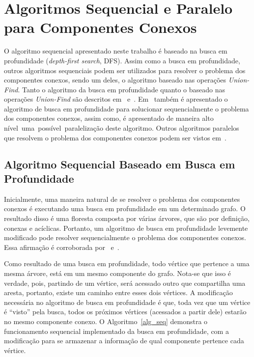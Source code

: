 \documentclass[12pt]{article}
\begin{document}
\section{Algoritmos Sequencial e Paralelo para Componentes Conexos}
\label{algoritmos}
O algoritmo sequencial apresentado neste trabalho é baseado na busca em profundidade (\emph{depth-first search}, DFS). Assim como a busca em profundidade, outros algoritmos sequenciais podem ser utilizados para resolver o problema dos componentes conexos, sendo um deles, o algoritmo baseado nas operações \emph{Union-Find}. Tanto o algoritmo da busca em profundidade quanto o baseado nas operações \emph{Union-Find} são descritos em~\cite{Sedgewick:2011} e~\cite{Cormen:2009}. Em~\cite{Grama:2003} também é apresentado o algoritmo de busca em profundidade para solucionar sequencialmente o problema dos componentes conexos, assim como, é apresentado de maneira alto nível uma possível paralelização deste algoritmo. Outros algoritmos paralelos que resolvem o problema dos componentes conexos podem ser vistos em~\cite{Roosta:1999}.

\subsection{Algoritmo Sequencial Baseado em Busca em Profundidade}

Inicialmente, uma maneira natural de se resolver o problema dos componentes conexos é executando uma busca em profundidade em um determinado grafo. O resultado disso é uma floresta composta por várias árvores, que são por definição, conexas e acíclicas. Portanto, um algoritmo de busca em profundidade levemente modificado pode resolver sequencialmente o problema dos componentes conexos. Essa afirmação é corroborada por~\cite{Grama:2003} e~\cite{Sedgewick:2011}.

Como resultado de uma busca em profundidade, todo vértice que pertence a uma mesma árvore, está em um mesmo componente do grafo. Nota-se que isso é verdade, pois, partindo de um vértice, será acessado outro que compartilha uma aresta, portanto, existe um caminho entre esses dois vértices. A modificação necessária no algoritmo de busca em profundidade é que, toda vez que um vértice é ``visto'' pela busca, todos os próximos vértices (acessados a partir dele) estarão no mesmo componente conexo. O Algoritmo~\ref{alg_seq} demonstra o funcionamento sequencial implementado da busca em profundidade, com a modificação para se armazenar a informação de qual componente pertence cada vértice.
\end{document}
